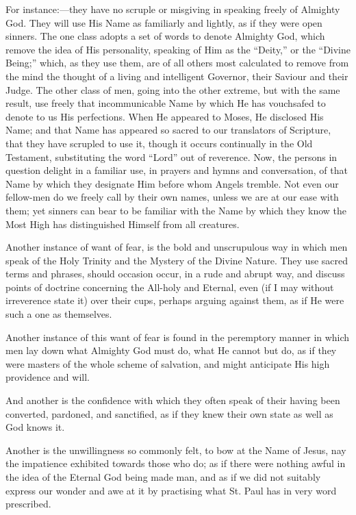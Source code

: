 For instance:—they have no scruple or misgiving in speaking
freely of Almighty God. They will use His Name as familiarly and
lightly, as if they were open sinners. The one class adopts a set of
words to denote Almighty God, which remove the idea of His
personality, speaking of Him as the ``Deity,'' or the
``Divine Being;'' which, as they use them, are of all others
most calculated to remove from the mind the thought of a living and
intelligent Governor, their Saviour and their Judge. The other class
of men, going into the other extreme, but with the same result, use
freely that incommunicable Name by which He has vouchsafed to denote
to us His perfections. When He appeared to Moses, He disclosed His
Name; and that Name has appeared so sacred to our translators of
Scripture, that they have scrupled to use it, though it occurs
continually in the Old Testament, substituting the word
``Lord'' out of reverence. Now, the persons in question
delight in a familiar use, in prayers and hymns and conversation, of
that Name by which they designate Him before whom Angels tremble. Not
even our fellow-men do we freely call by their own names, unless we
are at our ease with them; yet sinners can bear to be familiar with
the Name by which they know the Most High has distinguished Himself
from all creatures.

Another instance of want of fear, is the bold and unscrupulous way
in which men speak of the Holy Trinity and the Mystery of the Divine
Nature. They use sacred terms and phrases, should occasion occur, in a
rude and abrupt way, and discuss points of doctrine concerning the
All-holy and Eternal, even (if I may without irreverence state it)
over their cups, perhaps arguing against them, as if He were such a
one as themselves.

Another instance of this want of fear is found in the peremptory
manner in which men lay down what Almighty God must do, what He cannot
but do, as if they were masters of the whole scheme of salvation, and
might anticipate His high providence and will.

And another is the confidence with which they often speak of their
having been converted, pardoned, and sanctified, as if they knew their
own state as well as God knows it.

Another is the unwillingness so commonly felt, to bow at the Name
of Jesus, nay the impatience exhibited towards those who do; as if
there were nothing awful in the idea of the Eternal God being made
man, and as if we did not suitably express our wonder and awe at it by
practising what St. Paul has in very word prescribed.

